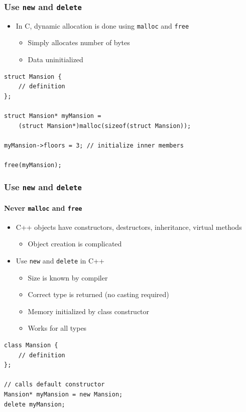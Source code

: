\documentclass[table]{beamer}
\newcounter{rulecount}
\newcommand{\declarerule}{\textbf{\color{themeblue}{Rule \therulecount:}} }
\begin{document}
\begin{frame}[fragile]
    \frametitle{\declarerule Use \texttt{new} and \texttt{delete} }
    \begin{itemize}
        \item In C, dynamic allocation is done using \texttt{malloc} and \texttt{free}
            \begin{itemize}
                \item Simply allocates number of bytes
                \item Data uninitialized
            \end{itemize}
    \end{itemize}
    \begin{lstlisting}[title=Dynamically allocating a struct in C]
struct Mansion {
    // definition
};

struct Mansion* myMansion =
    (struct Mansion*)malloc(sizeof(struct Mansion));

myMansion->floors = 3; // initialize inner members

free(myMansion);
    \end{lstlisting}
\end{frame}

\begin{frame}[fragile]
    \frametitle{\declarerule Use \texttt{new} and \texttt{delete} }
    \framesubtitle{Never \texttt{malloc} and \texttt{free} }
    \begin{itemize}
        \item C++ objects have constructors, destructors, inheritance, virtual methods
            \begin{itemize}
                \item Object creation is complicated
            \end{itemize}
        \item Use \texttt{new} and \texttt{delete} in C++
            \begin{itemize}
                \item Size is known by compiler
                \item Correct type is returned (no casting required)
                \item Memory initialized by class constructor
                \item Works for all types
            \end{itemize}
    \end{itemize}
    \begin{lstlisting}[title=Dynamically allocating an object in C++]
class Mansion {
    // definition
};

// calls default constructor
Mansion* myMansion = new Mansion;
delete myMansion;
    \end{lstlisting}
\end{frame}
\end{document}
